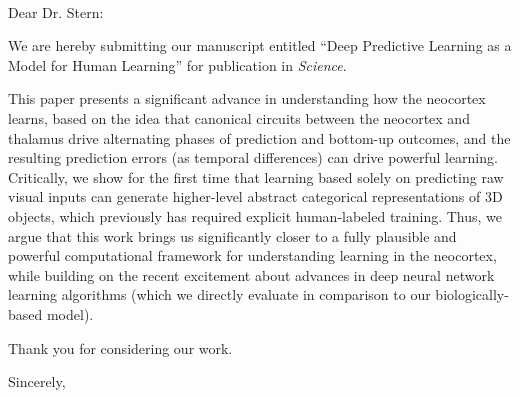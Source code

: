 \documentclass[11pt]{letter}
\begin{document}
\begin{letter}
{ \hspace*{.25in}\\}

\opening{Dear Dr. Stern:}

We are hereby submitting our manuscript entitled ``Deep Predictive Learning as a Model for Human Learning'' for publication in {\em Science}.

This paper presents a significant advance in understanding how the neocortex learns, based on the idea that canonical circuits between the neocortex and thalamus drive alternating phases of prediction and bottom-up outcomes, and the resulting prediction errors (as temporal differences) can drive powerful learning.  Critically, we show for the first time that learning based solely on predicting raw visual inputs can generate higher-level abstract categorical representations of 3D objects, which previously has required explicit human-labeled training.  Thus, we argue that this work brings us significantly closer to a fully plausible and powerful computational framework for understanding learning in the neocortex, while building on the recent excitement about advances in deep neural network learning algorithms (which we directly evaluate in comparison to our biologically-based model).

Thank you for considering our work.

\closing{Sincerely,}


\end{letter}
\end{document}
